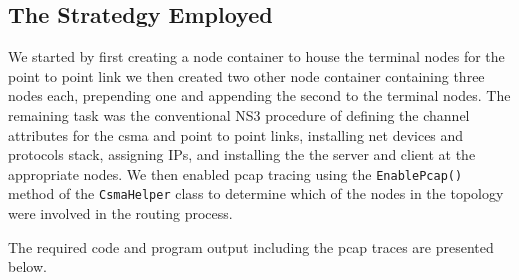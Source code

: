 \documentclass[fullpage]{article}
\begin{document}
\subsection{The Stratedgy Employed}
We started by first creating a node container to house the terminal nodes for the point to point
link we then created two other node container containing three nodes each, prepending one and
appending the second to the terminal nodes. The remaining task was the conventional NS3 procedure
of defining the channel attributes for the csma and point to point links, installing net devices
and protocols stack, assigning IPs, and installing the the server and client at the appropriate
nodes. We then enabled pcap tracing using the \verb|EnablePcap()| method of the \verb|CsmaHelper|
class to determine which of the nodes in the topology were involved in the routing process.

The required code and program output including the pcap traces are presented below.
\end{document}

